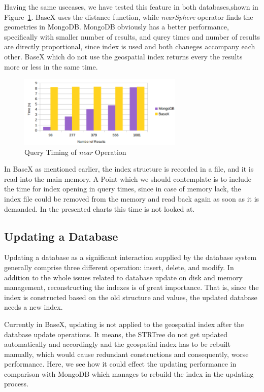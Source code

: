 \documentclass[a4paper,12pt]{article}
\begin{document}
Having the same usecases, we have tested this feature in both databases,shown in Figure~\ref{figBXvsMongoNear}. BaseX uses the distance function, while \textit{nearSphere} operator finds the geometries in MongoDB. MongoDB obviously has a better performance, specifically with smaller number of results, and qurey times and number of results are directly proportional, since index is used and both chaneges accompany each other. BaseX which do not use the geospatial index returns every the results more or less in the same time.



\begin{figure}
\centering
\includegraphics[width=0.7\textwidth]{BXvsMongoNear.png}
\caption{Query Timing of \textit{near} Operation}
\label{figBXvsMongoNear}
\end{figure}


In BaseX as mentioned earlier, the index structure is recorded in a file, and it is read into the main memory. A Point which we should contemplate is to include the time for index opening in query times, since in case of memory lack, the index file could be removed from the memory and read back again as soon as it is demanded. In the presented charts this time is not looked at.


\subsection{Updating a Database}
Updating a database as a significant interaction supplied by the database system generally comprise three different operation: insert, delete, and modify. In addition to the whole issues related to database update on disk and memory management, reconstructing the indexes is of great importance. That is, since the index is constructed based on the old structure and values, the updated database needs a new index. 

Currently in BaseX, updating is not applied to the geospatial index after the database update operations. It means, the STRTree do not get updated automatically and accordingly and the geospatial index has to be rebuilt manually, which would cause redundant constructions and consequently, worse performance. Here, we see how it could effect the updating performance in comparison with MongoDB which manages to rebuild the index in the updating process.
\end{document}
